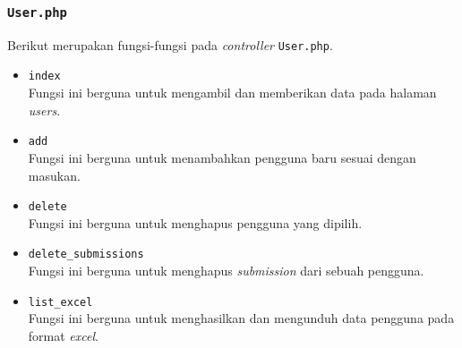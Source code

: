 \subsubsection{\texttt{User.php}}
Berikut merupakan fungsi-fungsi pada \textit{controller} \texttt{User.php}.
\begin{itemize}
	\item \texttt{index}\\
	Fungsi ini berguna untuk mengambil dan memberikan data pada halaman \textit{users}.
	\item \texttt{add}\\
	Fungsi ini berguna untuk menambahkan pengguna baru sesuai dengan masukan.
	\item \texttt{delete}\\
	Fungsi ini berguna untuk menghapus pengguna yang dipilih.
	\item \texttt{delete\_submissions}\\
	Fungsi ini berguna untuk menghapus \textit{submission} dari sebuah pengguna.
	\item \texttt{list\_excel}\\
	Fungsi ini berguna untuk menghasilkan dan mengunduh data pengguna pada format \textit{excel}.
\end{itemize}

